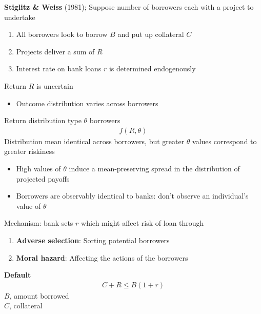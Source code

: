 \documentclass{beamer}
\begin{document}
\begin{frame}
 \textbf{Stiglitz \& Weiss} (1981); Suppose number of borrowers each with a project to undertake
\begin{enumerate}
  \item All borrowers look to borrow $B$ and put up collateral $C$
  \item Projects deliver a sum of $R$  
  \item Interest rate on bank loans $r$ is determined endogenously
\end{enumerate}
\end{frame}

\begin{frame} 
 Return $R$ is uncertain
 \begin{itemize}
   \item Outcome distribution varies across borrowers 
 \end{itemize}
 \medskip
 Return distribution type $\theta$ borrowers 
 \begin{align}
   f(R,\theta)
 \end{align}
 \medskip
 Distribution mean identical across borrowers, but greater $\theta$ values correspond to greater riskiness
 \begin{itemize}
   \item High values of $\theta$ induce a mean-preserving spread in the distribution of projected payoffs
   \item Borrowers are observably identical to banks: don't observe an individual's value of $\theta$
 \end{itemize}
\end{frame}

\begin{frame}
 Mechanism: bank sets $r$ which might affect risk of loan through
\begin{enumerate}
  \item \textbf{Adverse selection}: Sorting potential borrowers
  \item \textbf{Moral hazard}: Affecting the actions of the borrowers
\end{enumerate}
\end{frame}

\begin{frame}
 \textbf{Default} 
\begin{align}
  C+R\leq B(1+r)
\end{align}
\medskip
$B$, amount borrowed\\
$C$, collateral
\end{frame}
\end{document}
